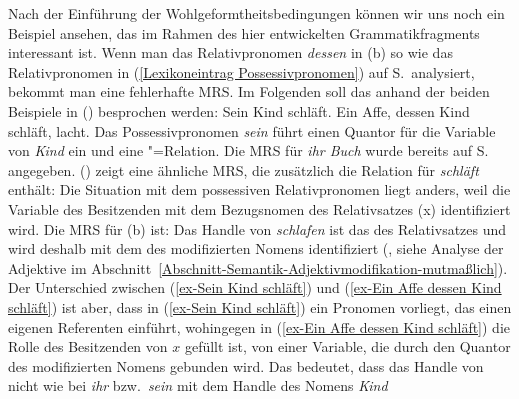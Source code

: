 Nach der Einführung der Wohlgeformtheitsbedingungen können wir uns noch ein Beispiel ansehen, das im
Rahmen des hier entwickelten Grammatikfragments interessant ist. Wenn man das Relativpronomen
\emph{dessen} in (b) so wie das Relativpronomen in (\ref{Lexikoneintrag Possessivpronomen})
auf S.\,\pageref{Lexikoneintrag Possessivpronomen} analysiert, bekommt man eine fehlerhafte MRS. Im
Folgenden soll das anhand der beiden Beispiele in () besprochen werden:
\eal
\ex\label{ex-Sein Kind schläft} 
Sein Kind schläft.
\ex\label{ex-Ein Affe dessen Kind schläft}
Ein Affe, dessen Kind schläft, lacht.
\zl
Das Possessivpronomen \emph{sein} führt einen Quantor für die Variable von \emph{Kind} ein und eine
"=Relation. Die MRS für \emph{ihr Buch} wurde bereits auf S.\,\pageref{MRS ihr
  Buch} angegeben. () zeigt eine ähnliche MRS, die zusätzlich die Relation für \emph{schläft} enthält:
\ea
\label{MRS ihr Buch-2}
\z
Die Situation mit dem possessiven Relativpronomen liegt anders, weil die Variable des Besitzenden
mit dem Bezugsnomen des Relativsatzes (x) identifiziert wird. Die MRS für (b) ist:
\ea
\label{MRS EIn Affe dessen Kind schläft lacht}
\z
Das Handle von \emph{schlafen} ist das \ltop des Relativsatzes und wird deshalb mit dem \ltop des
modifizierten Nomens identifiziert (, siehe Analyse der Adjektive im Abschnitt~\ref{Abschnitt-Semantik-Adjektivmodifikation-mutmaßlich}). Der Unterschied zwischen (\ref{ex-Sein Kind
  schläft}) und (\ref{ex-Ein Affe dessen Kind schläft}) ist aber, dass in (\ref{ex-Sein Kind
  schläft}) ein Pronomen vorliegt, das einen eigenen Referenten einführt, wohingegen in (\ref{ex-Ein
  Affe dessen Kind schläft}) die Rolle des Besitzenden von $x$ gefüllt ist, \dash von einer
Variable, die durch den Quantor des modifizierten Nomens gebunden wird. Das bedeutet, dass das
Handle von  nicht wie bei \emph{ihr} bzw.\ \emph{sein} mit dem Handle des Nomens \emph{Kind}
